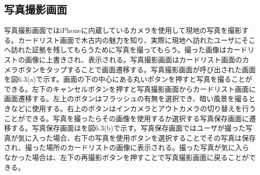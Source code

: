 \subsection{写真撮影画面}
写真撮影画面ではiPhoneに内蔵しているカメラを使用して現地の写真を撮影する。カードリスト画面で木古内の魅力を知り、実際に現地へ訪れたユーザにそこへ訪れた証拠を残してもらうために写真を撮ってもらう。撮った画像はカードリストの画像に上書きされ、表示される。写真撮影画面はカードリスト画面のカメラボタンをタップすることで画面遷移する。写真撮影画面が呼び出された画面を図6.3(a)で示す。画面の下の中心にある丸いボタンを押すと写真を撮ることができる。左下のキャンセルボタンを押すと写真撮影画面からカードリスト画面に画面遷移する。左上のボタンはフラッシュの有無を選択でき、暗い風景を撮るときなどに使用する。右上のボタンはインカメラとアウトカメラの切り替えを行うことができる。写真を撮ったらその画像を使用するか選択する写真保存画面に遷移する。写真保存画面はを図6.3(b)で示す。写真保存画面ではユーザが撮った写真が気に入った場合、右下の写真を使用ボタンを選択することでその写真は保存され、撮った場所のカードリストの画像に表示される。撮った写真が気に入らなかった場合は、左下の再撮影ボタンを押すことで写真撮影画面に戻ることができる。
\newpage

